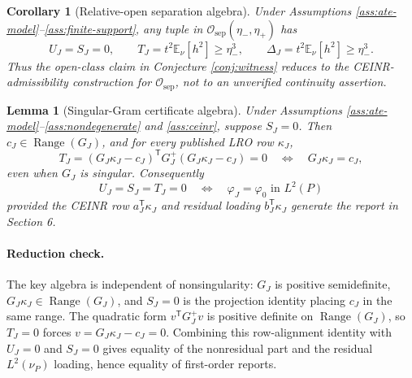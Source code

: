 \documentclass[11pt]{article}
\newcommand{\E}{\mathbb{E}}
\newcommand{\transpose}{\mathsf{T}}
\theoremstyle{definition}
\theoremstyle{plain}
\newtheorem{lemma}{Lemma}
\newtheorem{corollary}{Corollary}
\theoremstyle{remark}
\begin{document}
\begin{corollary}[Relative-open separation algebra]\label{cor:open-separation}
Under Assumptions \ref{ass:ate-model}--\ref{ass:finite-support}, any tuple in
\(\mathcal O_{\mathrm{sep}}(\eta_-,\eta_+)\) has
\[
U_J=S_J=0,\qquad T_J=t^2\E_\nu[h^2]\ge \eta_-^3,\qquad
\Delta_J=t^2\E_\nu[h^2]\ge \eta_-^3.
\]
Thus the open-class claim in Conjecture \ref{conj:witness} reduces to the
CEINR-admissibility construction for \(\mathcal O_{\mathrm{sep}}\), not to an
unverified continuity assertion.
\end{corollary}

\begin{lemma}[Singular-Gram certificate algebra]\label{lem:singular-gram}
Under Assumptions \ref{ass:ate-model}--\ref{ass:nondegenerate} and
\ref{ass:ceinr}, suppose \(S_J=0\).  Then \(c_J\in\operatorname{Range}(G_J)\),
and for every published LRO row \(\kappa_J\),
\[
T_J=(G_J\kappa_J-c_J)^\transpose G_J^+(G_J\kappa_J-c_J)=0
\quad\Longleftrightarrow\quad
G_J\kappa_J=c_J,
\]
even when \(G_J\) is singular.  Consequently
\[
U_J=S_J=T_J=0
\quad\Longleftrightarrow\quad
\varphi_J=\varphi_0\text{ in }L^2(P)
\]
provided the CEINR row \(a_J^\transpose\kappa_J\) and residual loading
\(b_J^\transpose\kappa_J\) generate the report in Section 6.
\end{lemma}
\paragraph{Reduction check.}
The key algebra is independent of nonsingularity: \(G_J\) is positive
semidefinite, \(G_J\kappa_J\in\operatorname{Range}(G_J)\), and
\(S_J=0\) is the projection identity placing \(c_J\) in the same range.  The
quadratic form \(v^\transpose G_J^+v\) is positive definite on
\(\operatorname{Range}(G_J)\), so \(T_J=0\) forces
\(v=G_J\kappa_J-c_J=0\).  Combining this row-alignment identity with
\(U_J=0\) and \(S_J=0\) gives equality of the nonresidual part and the
residual \(L^2(\nu_P)\) loading, hence equality of first-order reports.
\end{document}
